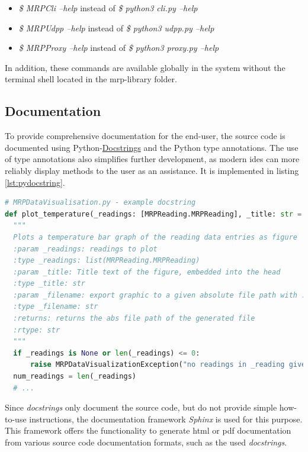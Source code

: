 \begin{itemize}
\tightlist
\item
  \emph{\$ MRPCli --help} instead of \emph{\$ python3 cli.py --help}
\item
  \emph{\$ MRPUdpp --help} instead of \emph{\$ python3 udpp.py --help}
\item
  \emph{\$ MRPProxy --help} instead of \emph{\$ python3 proxy.py --help}
\end{itemize}

In addition, these commands are available globally in the system without
the terminal shell located in the \gls{mrp}-library folder.

\hypertarget{documentation}{%
\subsection{Documentation}\label{documentation}}

To provide comprehensive documentation for the end-user, the source code
is documented using
Python-\href{https://peps.python.org/pep-0257/}{Docstrings} and the
Python type annotations. The use of type annotations also simplifies
further development, as modern \gls{ide}s can more reliably display
methods to the user as an assistance. It is implemented in listing
\ref{lst:pydocstring}.

\begin{lstlisting}[language=Python, caption={Documentation using Python docstring example}, label=lst:pydocstring]
# MRPDataVisualisation.py - example docstring
def plot_temperature(_readings: [MRPReading.MRPReading], _title: str = '', _filename: str = None, _unit: str = "degree C") -> str:
  """
  Plots a temperature bar graph of the reading data entries as figure
  :param _readings: readings to plot
  :type _readings: list(MRPReading.MRPReading)
  :param _title: Title text of the figure, embedded into the head
  :type _title: str
  :param _filename: export graphic to a given absolute file path with .png
  :type _filename: str
  :returns: returns the abs file path of the generated file
  :rtype: str
  """
  if _readings is None or len(_readings) <= 0:
      raise MRPDataVisualizationException("no readings in _reading given")
  num_readings = len(_readings)
  # ...
\end{lstlisting}

Since \emph{docstrings} only document the source code, but do not
provide simple how-to-use instructions, the documentation framework
\emph{Sphinx}  is used for this purpose. This framework
offers the functionality to generate \gls{html} or \gls{pdf}
documentation from various source code documentation formats, such as
the used \emph{docstrings}.

